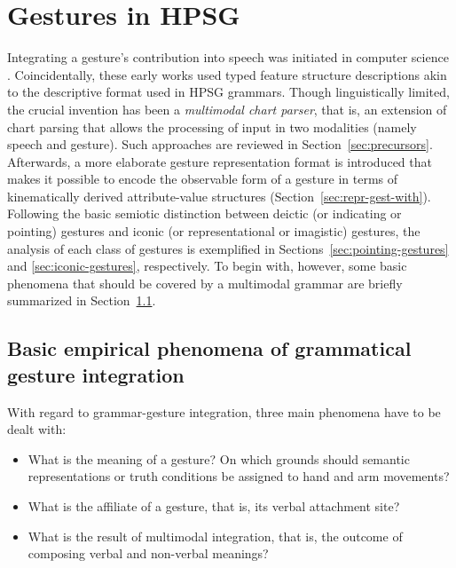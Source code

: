 \documentclass[output=paper]{langsci/langscibook}
\begin{document}
\section{Gestures in HPSG}
\label{sec:gestures-hpsg}

Integrating a gesture's contribution into speech was initiated in computer science \citep{Bolt:1980}.
%
Coincidentally, these early works used typed feature structure descriptions akin to the descriptive format used in HPSG grammars.
%
Though linguistically limited, the crucial invention has been a \emph{multimodal chart parser},  that is, an extension of chart parsing that allows the processing of input in two modalities (namely speech and gesture).
%
Such approaches are reviewed in Section~\ref{sec:precursors}.
%
Afterwards, a more elaborate gesture representation format is introduced that makes it possible to encode the observable form of a gesture in terms of kinematically derived attribute-value structures (Section~\ref{sec:repr-gest-with}).
%
Following the basic semiotic distinction between deictic (or indicating or pointing) gestures and iconic (or representational or imagistic) gestures, the analysis of each class of gestures is exemplified in Sections~\ref{sec:pointing-gestures} and \ref{sec:iconic-gestures}, respectively.
%
To begin with, however, some basic phenomena that should be covered by a multimodal grammar are briefly summarized in Section~\ref{sec:empir-desid-gramm}.



\subsection{Basic empirical phenomena of grammatical gesture integration}
\label{sec:empir-desid-gramm}

With regard to grammar-gesture integration, three main phenomena have to be dealt with:
%
\begin{itemize}
\item What is the meaning of a gesture? On which grounds should semantic representations or truth conditions be assigned to hand and arm movements?
\item What is the affiliate of a gesture, that is, its verbal attachment site?  
\item What is the result of multimodal integration, that is, the outcome of composing verbal and non-verbal meanings? 
\end{itemize}
\end{document}
